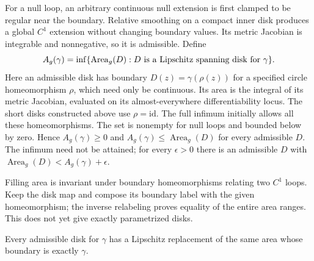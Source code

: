 For a null loop, an arbitrary continuous null extension is first clamped to
be regular near the boundary. Relative smoothing on a compact inner disk
produces a global $C^1$ extension without changing boundary values. Its metric
Jacobian is integrable and nonnegative, so it is admissible. Define
\[
 A_g(\gamma)=\inf\{ {\rm Area}_g(D):D\text{ is a Lipschitz spanning disk for }\gamma\}.
\]
Here an admissible disk has boundary $D(z)=\gamma(\rho(z))$ for a
specified circle homeomorphism $\rho$, which need only be continuous.
Its area is the integral of its metric Jacobian, evaluated on its
almost-everywhere differentiability locus. The short disks constructed
above use $\rho=\mathrm{id}$. The full infimum initially allows all
these homeomorphisms.
The set is nonempty for null loops and bounded below by zero. Hence
$A_g(\gamma)\geq0$ and $A_g(\gamma)\leq\operatorname{Area}_g(D)$ for every
admissible $D$. The infimum need not be attained; for every $\epsilon>0$
there is an admissible $D$ with
$\operatorname{Area}_g(D)<A_g(\gamma)+\epsilon$.

Filling area is invariant under boundary homeomorphisms relating two
$C^1$ loops. Keep the disk map and compose its boundary label with the
given homeomorphism; the inverse relabeling proves equality of the
entire area ranges. This does not yet give exactly parametrized disks.

\begin{lemma}
\label{lem:filling-boundary-regularization}
Every admissible disk for $\gamma$ has a Lipschitz replacement of the
same area whose boundary is exactly $\gamma$.
\end{lemma}

